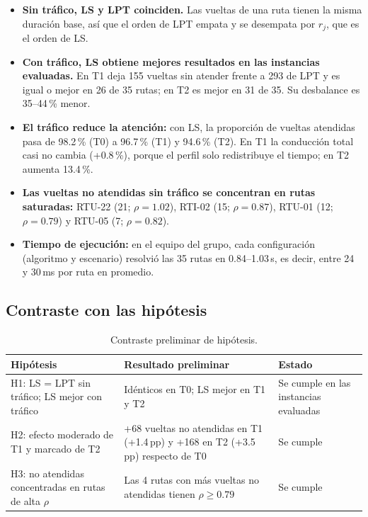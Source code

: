 \begin{itemize}
  \item \textbf{Sin tráfico, LS y LPT coinciden.} Las vueltas de una ruta tienen la misma duración base, así que el orden de LPT empata y se desempata por $r_j$, que es el orden de LS.
  \item \textbf{Con tráfico, LS obtiene mejores resultados en las instancias evaluadas.} En T1 deja 155 vueltas sin atender frente a 293 de LPT y es igual o mejor en 26 de 35 rutas; en T2 es mejor en 31 de 35. Su desbalance es 35--44\,\% menor.
  \item \textbf{El tráfico reduce la atención:} con LS, la proporción de vueltas atendidas pasa de 98.2\,\% (T0) a 96.7\,\% (T1) y 94.6\,\% (T2). En T1 la conducción total casi no cambia (+0.8\,\%), porque el perfil solo redistribuye el tiempo; en T2 aumenta 13.4\,\%.
  \item \textbf{Las vueltas no atendidas sin tráfico se concentran en rutas saturadas:} RTU-22 (21; $\rho = 1.02$), RTI-02 (15; $\rho = 0.87$), RTU-01 (12; $\rho = 0.79$) y RTU-05 (7; $\rho = 0.82$).
  \item \textbf{Tiempo de ejecución:} en el equipo del grupo, cada configuración (algoritmo y escenario) resolvió las 35 rutas en 0.84--1.03\,s, es decir, entre 24 y 30\,ms por ruta en promedio.
\end{itemize}

\subsection{Contraste con las hipótesis}
\begin{table}[H]
\centering\small
\caption{Contraste preliminar de hipótesis.}
\begin{tabularx}{\textwidth}{L{4.8cm}YL{3.0cm}}
\toprule
Hipótesis & Resultado preliminar & Estado \\
\midrule
H1: LS = LPT sin tráfico; LS mejor con tráfico & Idénticos en T0; LS mejor en T1 y T2 & Se cumple en las instancias evaluadas \\
H2: efecto moderado de T1 y marcado de T2 & +68 vueltas no atendidas en T1 (+1.4\,pp) y +168 en T2 (+3.5\,pp) respecto de T0 & Se cumple \\
H3: no atendidas concentradas en rutas de alta $\rho$ & Las 4 rutas con más vueltas no atendidas tienen $\rho \ge 0.79$ & Se cumple \\
\bottomrule
\end{tabularx}
\end{table}
